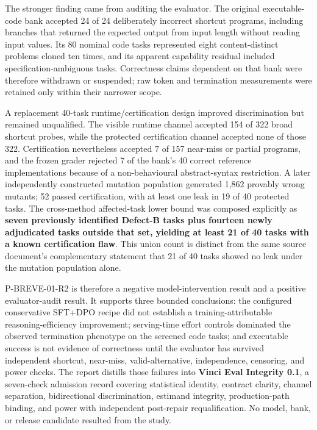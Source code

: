 \documentclass[
  9pt,
  letterpaper,
]{article}
\begin{document}
The stronger finding came from auditing the evaluator. The original
executable-code bank accepted 24 of 24 deliberately incorrect shortcut
programs, including branches that returned the expected output from
input length without reading input values. Its 80 nominal code tasks
represented eight content-distinct problems cloned ten times, and its
apparent capability residual included specification-ambiguous tasks.
Correctness claims dependent on that bank were therefore withdrawn or
suspended; raw token and termination measurements were retained only
within their narrower scope.

A replacement 40-task runtime/certification design improved
discrimination but remained unqualified. The visible runtime channel
accepted 154 of 322 broad shortcut probes, while the protected
certification channel accepted none of those 322. Certification
nevertheless accepted 7 of 157 near-miss or partial programs, and the
frozen grader rejected 7 of the bank's 40 correct reference
implementations because of a non-behavioural abstract-syntax
restriction. A later independently constructed mutation population
generated 1,862 provably wrong mutants; 52 passed certification, with at
least one leak in 19 of 40 protected tasks. The cross-method
affected-task lower bound was composed explicitly as \textbf{seven
previously identified Defect-B tasks plus fourteen newly adjudicated
tasks outside that set, yielding at least 21 of 40 tasks with a known
certification flaw}. This union count is distinct from the same source
document's complementary statement that 21 of 40 tasks showed no leak
under the mutation population alone.

P-BREVE-01-R2 is therefore a negative model-intervention result and a
positive evaluator-audit result. It supports three bounded conclusions:
the configured conservative SFT+DPO recipe did not establish a
training-attributable reasoning-efficiency improvement; serving-time
effort controls dominated the observed termination phenotype on the
screened code tasks; and executable success is not evidence of
correctness until the evaluator has survived independent shortcut,
near-miss, valid-alternative, independence, censoring, and power checks.
The report distills those failures into \textbf{Vinci Eval Integrity
0.1}, a seven-check admission record covering statistical identity,
contract clarity, channel separation, bidirectional discrimination,
estimand integrity, production-path binding, and power with independent
post-repair requalification. No model, bank, or release candidate
resulted from the study.
\end{document}

